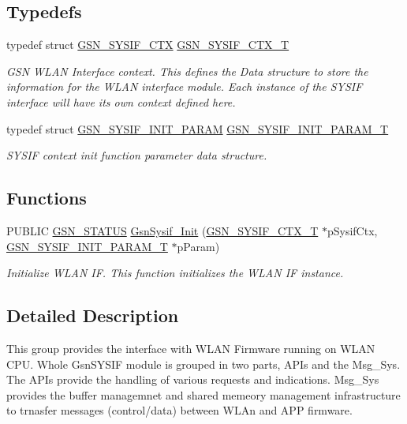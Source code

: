\subsection*{Typedefs}
\begin{DoxyCompactItemize}
\item 
typedef struct \hyperlink{a00261}{GSN\_\-SYSIF\_\-CTX} \hyperlink{a00630_ga4109d84173a303c73e534f9bc6e04a03}{GSN\_\-SYSIF\_\-CTX\_\-T}
\begin{DoxyCompactList}\small\item\em GSN WLAN Interface context. This defines the Data structure to store the information for the WLAN interface module. Each instance of the SYSIF interface will have its own context defined here. \end{DoxyCompactList}\item 
typedef struct \hyperlink{a00262}{GSN\_\-SYSIF\_\-INIT\_\-PARAM} \hyperlink{a00630_gaefe015ce31bfc3747e1caed732284b8e}{GSN\_\-SYSIF\_\-INIT\_\-PARAM\_\-T}
\begin{DoxyCompactList}\small\item\em SYSIF context init function parameter data structure. \end{DoxyCompactList}\end{DoxyCompactItemize}
\subsection*{Functions}
\begin{DoxyCompactItemize}
\item 
PUBLIC \hyperlink{a00660_gada5951904ac6110b1fa95e51a9ddc217}{GSN\_\-STATUS} \hyperlink{a00630_ga921cdc829cd7b875a0cb53c093c2b9da}{GsnSysif\_\-Init} (\hyperlink{a00261}{GSN\_\-SYSIF\_\-CTX\_\-T} $\ast$pSysifCtx, \hyperlink{a00262}{GSN\_\-SYSIF\_\-INIT\_\-PARAM\_\-T} $\ast$pParam)
\begin{DoxyCompactList}\small\item\em Initialize WLAN IF. This function initializes the WLAN IF instance. \end{DoxyCompactList}\end{DoxyCompactItemize}


\subsection{Detailed Description}
This group provides the interface with WLAN Firmware running on WLAN CPU. Whole GsnSYSIF module is grouped in two parts, APIs and the Msg\_\-Sys. The APIs provide the handling of various requests and indications. Msg\_\-Sys provides the buffer managemnet and shared memeory management infrastructure to trnasfer messages (control/data) between WLAn and APP firmware. 

